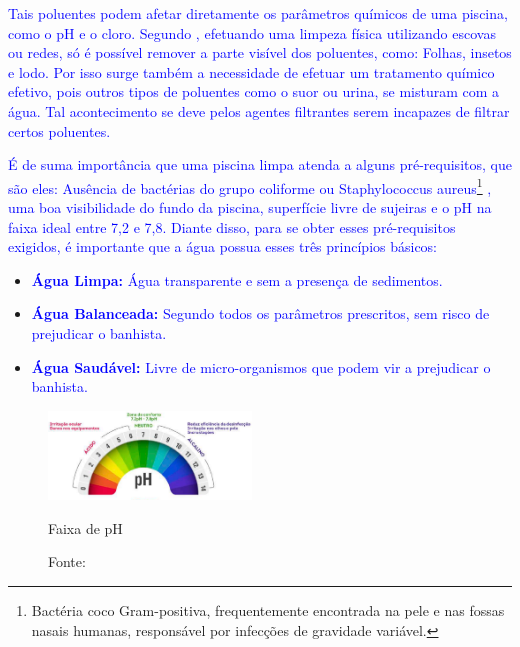        \textcolor{blue}{Tais poluentes podem afetar diretamente os parâmetros químicos de uma piscina, como o pH e o cloro. Segundo \cite{guiaTratamento}, efetuando uma limpeza física utilizando escovas ou redes, só é possível remover a parte visível dos poluentes, como: Folhas, insetos e lodo. Por isso surge também a necessidade de efetuar um tratamento químico efetivo, pois outros tipos de poluentes como o suor ou urina, se misturam com a água. Tal acontecimento se deve pelos agentes filtrantes serem incapazes de filtrar certos poluentes.}


       \textcolor{blue}{É de suma importância que uma piscina limpa atenda a alguns pré-requisitos, que são eles: Ausência de bactérias do grupo coliforme ou Staphylococcus aureus\footnote{Bactéria coco Gram-positiva, frequentemente encontrada na pele e nas fossas nasais humanas, responsável por infecções de gravidade variável.} , uma boa visibilidade do fundo da piscina, superfície livre de sujeiras e o pH na faixa ideal entre 7,2 e 7,8. Diante disso, para se obter esses pré-requisitos exigidos, é importante que a água possua esses três princípios básicos:}
    
       \begin{itemize}
            \item \textbf{\textcolor{blue}{Água Limpa:}} \textcolor{blue}{Água transparente e sem a presença de sedimentos.}
            
            \item \textbf{\textcolor{blue}{Água Balanceada:}} \textcolor{blue}{Segundo todos os parâmetros prescritos, sem risco de prejudicar o banhista.}
             
            \item \textbf{\textcolor{blue}{Água Saudável:}} \textcolor{blue}{Livre de micro-organismos que podem vir a prejudicar o banhista.}
            
        \end{itemize}

        \begin{figure}[H]
                \centering
                \caption{ }  
            	\centering
                \label{fig:cont}
            	\includegraphics[width=0.48\textwidth]{imagens/medidorPh.png}
                \caption*{Faixa de pH}
            	\caption*{Fonte: \cite{guiaTratamento}}
        \end{figure}


